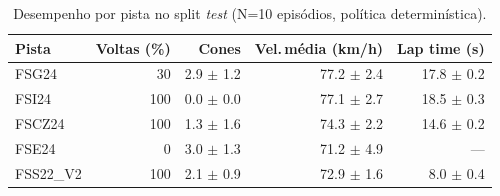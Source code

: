 \begin{table}[H]
\centering
\caption{Desempenho por pista no split \textit{test} (N=10 episódios, política determinística).}
\label{tab:per_track_test}
\begin{tabular}{lrrrr}
\toprule
\textbf{Pista} & \textbf{Voltas (\%)} & \textbf{Cones} & \textbf{Vel.\,m\'edia (km/h)} & \textbf{Lap time (s)} \\
\midrule
FSG24 & 30 & 2.9 $\pm$ 1.2 & 77.2 $\pm$ 2.4 & 17.8 $\pm$ 0.2 \\
FSI24 & 100 & 0.0 $\pm$ 0.0 & 77.1 $\pm$ 2.7 & 18.5 $\pm$ 0.3 \\
FSCZ24 & 100 & 1.3 $\pm$ 1.6 & 74.3 $\pm$ 2.2 & 14.6 $\pm$ 0.2 \\
FSE24 & 0 & 3.0 $\pm$ 1.3 & 71.2 $\pm$ 4.9 & --- \\
FSS22_V2 & 100 & 2.1 $\pm$ 0.9 & 72.9 $\pm$ 1.6 & 8.0 $\pm$ 0.4 \\
\bottomrule
\end{tabular}
\end{table}

